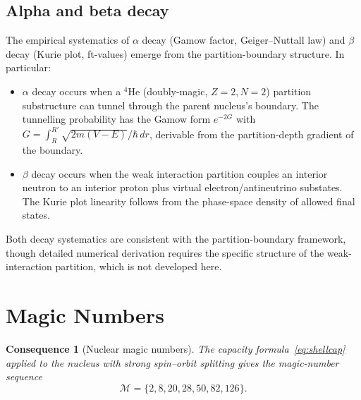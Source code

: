 \documentclass[11pt,twocolumn,a4paper]{article}
\theoremstyle{axiomstyle}
\theoremstyle{conseqstyle}
\newtheorem{consequence}{Consequence}
\theoremstyle{definition}
\theoremstyle{remark}
\begin{document}
\subsection{Alpha and beta decay}

The empirical systematics of $\alpha$ decay (Gamow factor, Geiger--Nuttall law) and $\beta$ decay (Kurie plot, ft-values) emerge from the partition-boundary structure. In particular:
\begin{itemize}
\item $\alpha$ decay occurs when a $^{4}$He (doubly-magic, $Z=2,N=2$) partition substructure can tunnel through the parent nucleus's boundary. The tunnelling probability has the Gamow form $e^{-2G}$ with $G=\int_{R}^{R'}\sqrt{2m(V-E)}/\hbar\,dr$, derivable from the partition-depth gradient of the boundary.
\item $\beta$ decay occurs when the weak interaction partition couples an interior neutron to an interior proton plus virtual electron/antineutrino substates. The Kurie plot linearity follows from the phase-space density of allowed final states.
\end{itemize}
Both decay systematics are consistent with the partition-boundary framework, though detailed numerical derivation requires the specific structure of the weak-interaction partition, which is not developed here.

\section{Magic Numbers}
\label{sec:magicnumbers}

\begin{consequence}[Nuclear magic numbers]
\label{cons:magicnumbers}
The capacity formula~\eqref{eq:shellcap} applied to the nucleus with strong spin--orbit splitting gives the magic-number sequence
\begin{equation}
\mathcal{M}=\{2,8,20,28,50,82,126\}.
\label{eq:magicnumbers}
\end{equation}
\end{consequence}
\end{document}
